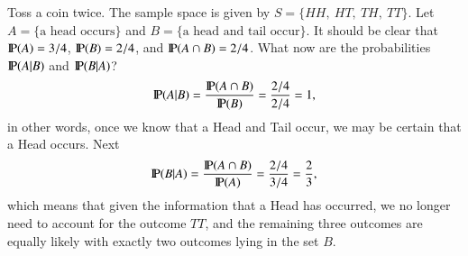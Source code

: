 \documentclass[captions=tableheading]{scrbook}
\begin{document}
\begin{example}
Toss a coin twice. The sample space is given by \(S=\{ HH,\ HT,\ TH,\ TT \} \). Let \(A= \{ \mbox{a head occurs} \} \) and \(B= \{ \mbox{a head and tail occur} \} \). It should be clear that \(\P(A)=3/4\), \(\P(B)=2/4\), and \(\P(A\cap B)=2/4\). What now are the probabilities \(\P(A|B)\) and \(\P(B|A)\)?
\[
\P(A|B)=\frac{\P(A\cap B)}{\P(B)}=\frac{2/4}{2/4}=1,
\]
in other words, once we know that a Head and Tail occur, we may be certain that a Head occurs. Next
\[
\P(B|A)=\frac{\P(A\cap B)}{\P(A)}=\frac{2/4}{3/4}=\frac{2}{3},
\]
which means that given the information that a Head has occurred, we no longer need to account for the outcome \(TT\), and the remaining three outcomes are equally likely with exactly two outcomes lying in the set \(B\). 
\end{example}
\end{document}
